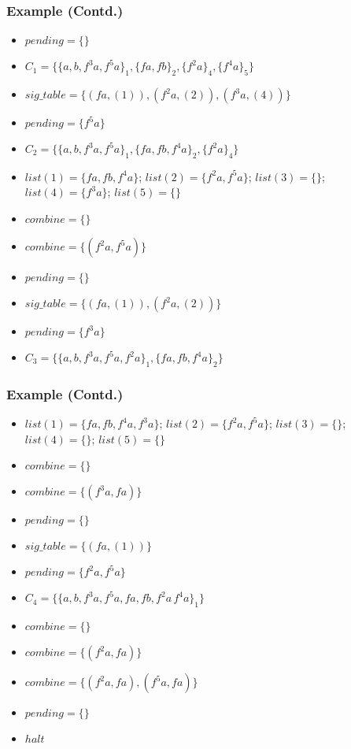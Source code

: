 \documentclass{beamer}
\begin{document}
\begin{frame}
  \frametitle{Example (Contd.)}
  \begin{itemize}
  \item $pending = \{\}$
  \item $C_1 = \{\{a, b, f^3 a, f^5 a\}_1 ,\{f a, f b\}_2  ,\{f^2 a\}_4 ,\{f^4 a\}_5\}$
  \item $sig\_table = \{(f a , (1)), (f^2 a , (2) ), (f^3 a, (4))\}$
  \item $pending = \{f^5 a\}$
  \item $C_2 = \{\{a, b, f^3 a, f^5 a\}_1 ,\{f a, f b, f^4 a\}_2  ,\{f^2 a\}_4 \}$
  \item $list(1) = \{f a, f b, f^4 a\}$; $list(2) = \{f^2 a, f^5 a\}$; $list(3) = \{\}$; $list(4) = \{f^3 a\}$; $list(5) = \{\}$
  \item $combine = \{\}$
  \item $combine = \{(f^2 a, f^5 a)\}$
  \item $pending = \{\}$
  \item $sig\_table = \{(fa, (1)), (f^2 a, (2))\}$
  \item $pending = \{f ^ 3 a\}$
  \item $C_3 = \{\{a, b, f^3 a, f^5 a, f^2 a\}_1 ,\{f a, f b, f^4 a\}_2\}$
  \end{itemize}
\end{frame}

\begin{frame}
  \frametitle{Example (Contd.)}
  \begin{itemize}
  \item $list(1) = \{f a, f b, f^4 a, f^3 a\}$; $list(2) = \{f^2 a, f^5 a\}$; $list(3) = \{\}$; $list(4) = \{\}$; $list(5) = \{\}$
  \item $combine = \{\}$
  \item $combine = \{(f^3 a, f a)\}$
  \item $pending = \{\}$
  \item $sig\_table = \{(fa, (1))\}$
  \item $pending = \{f^2 a, f^5 a\}$
  \item $C_4 = \{\{a, b, f^3 a, f^5 a, f a, f b, f^2 a\, f^4 a\}_1\}$
  \item $combine = \{\}$
  \item $combine = \{(f^2 a, f a)\}$
  \item $combine = \{(f^2 a, f a), (f^5 a, f a)\}$
  \item $pending = \{\}$
  \item $halt$
  \end{itemize}
\end{frame}
\end{document}
